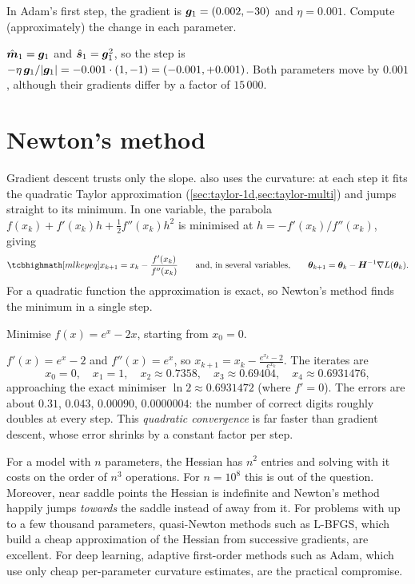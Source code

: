 \begin{exercise}
In Adam's first step, the gradient is $\bm{g}_1 = (0.002, -30)$ and $\eta = 0.001$.
Compute (approximately) the change in each parameter.
\end{exercise}
\begin{solution}
$\hat{\bm{m}}_1 = \bm{g}_1$ and $\hat{\bm{s}}_1 = \bm{g}_1^2$, so the step is
$-\eta\,\bm{g}_1/\lvert\bm{g}_1\rvert = -0.001\cdot(1, -1) = (-0.001, +0.001)$. Both
parameters move by $0.001$, although their gradients differ by a factor of
$15\,000$.
\end{solution}

\section{Newton's method}\label{sec:newton}

Gradient descent trusts only the slope.  also uses the
curvature: at each step it fits the quadratic Taylor approximation
(\cref{sec:taylor-1d,sec:taylor-multi}) and jumps straight to its minimum. In one
variable, the parabola $f(x_k) + f'(x_k)h + \frac12f''(x_k)h^2$ is minimised at
$h = -f'(x_k)/f''(x_k)$, giving
\[
  \keyeq{x_{k+1} = x_k - \frac{f'(x_k)}{f''(x_k)}}
  \qquad\text{and, in several variables,}\qquad
  \vtheta_{k+1} = \vtheta_k - \mH^{-1}\nabla L(\vtheta_k).
\]
For a quadratic function the approximation is exact, so Newton's method finds
the minimum in a single step.

\begin{example}\label{ex:newton}
Minimise $f(x) = e^x - 2x$, starting from $x_0 = 0$.

\sol $f'(x) = e^x - 2$ and $f''(x) = e^x$, so $x_{k+1} = x_k - \frac{e^{x_k} -
2}{e^{x_k}}$. The iterates are
\[
  x_0 = 0,\quad x_1 = 1,\quad x_2 \approx 0.7358,\quad x_3 \approx 0.69404,
  \quad x_4 \approx 0.6931476,
\]
approaching the exact minimiser $\ln2 \approx 0.6931472$ (where $f' = 0$). The
errors are about $0.31$, $0.043$, $0.00090$, $0.0000004$: the number of correct
digits roughly doubles at every step. This \emph{quadratic convergence} is far
faster than gradient descent, whose error shrinks by a constant factor per step.
\end{example}

\begin{mlnote}
For a model with $n$ parameters, the Hessian has $n^2$ entries and solving with it
costs on the order of $n^3$ operations. For $n = 10^8$ this is out of the
question. Moreover, near saddle points the Hessian is indefinite and Newton's
method happily jumps \emph{towards} the saddle instead of away from it. For
problems with up to a few thousand parameters, quasi-Newton methods such as
L-BFGS, which build a cheap approximation of the Hessian from successive
gradients, are excellent. For deep learning, adaptive first-order methods such
as Adam, which use only cheap per-parameter curvature estimates, are the
practical compromise.
\end{mlnote}

